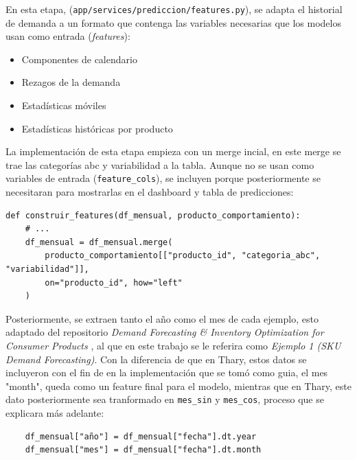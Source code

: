 En esta etapa, (\texttt{app/services/prediccion/features.py}), se adapta el historial de demanda a un formato que contenga las variables necesarias que los modelos usan como entrada (\textit{features}):

\begin{itemize}
    \item Componentes de calendario
    \item Rezagos de la demanda
    \item Estadísticas móviles
    \item Estadísticas históricas por producto
\end{itemize}

La implementación de esta etapa empieza con un merge incial, en este merge se trae las categorías abc y variabilidad a la tabla. Aunque no se usan como variables de entrada (\texttt{feature\_cols}), se incluyen porque posteriormente se necesitaran para mostrarlas en el dashboard y tabla de predicciones:

\label{lst:features_merge}
\begin{verbatim}
def construir_features(df_mensual, producto_comportamiento):
    # ...
    df_mensual = df_mensual.merge(
        producto_comportamiento[["producto_id", "categoria_abc", "variabilidad"]],
        on="producto_id", how="left"
    )

\end{verbatim}

Posteriormente, se extraen tanto el año como el mes de cada ejemplo, esto adaptado del repositorio \textit{Demand Forecasting \& Inventory Optimization for Consumer Products} \cite{ejemplo1_demandforecast}, al que en este trabajo se le referira como \textit{Ejemplo 1 (SKU Demand Forecasting)}. Con la diferencia de que en Thary, estos datos se incluyeron con el fin de en la implementación que se tomó como guia, el mes "month", queda como un feature final para el modelo, mientras que en Thary, este dato posteriormente sea tranformado en \texttt{mes\_sin} y \texttt{mes\_cos}, proceso que se explicara más adelante:

\label{lst:features_anio_mes}
\begin{verbatim}
    df_mensual["año"] = df_mensual["fecha"].dt.year
    df_mensual["mes"] = df_mensual["fecha"].dt.month
\end{verbatim}

